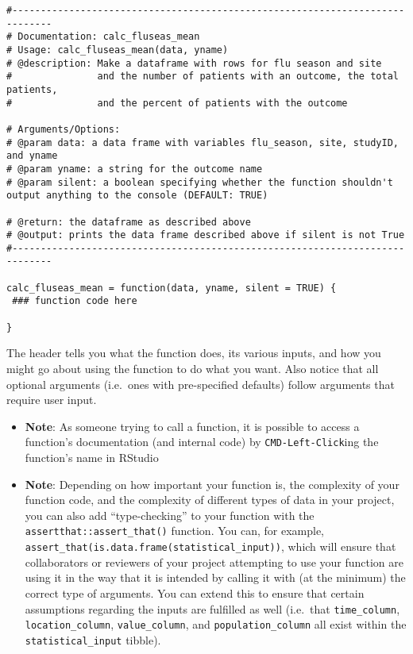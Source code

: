 \documentclass[]{book}
\begin{document}
\begin{verbatim}
#-----------------------------------------------------------------------------
# Documentation: calc_fluseas_mean
# Usage: calc_fluseas_mean(data, yname)
# @description: Make a dataframe with rows for flu season and site
#               and the number of patients with an outcome, the total patients,
#               and the percent of patients with the outcome

# Arguments/Options:
# @param data: a data frame with variables flu_season, site, studyID, and yname
# @param yname: a string for the outcome name
# @param silent: a boolean specifying whether the function shouldn't output anything to the console (DEFAULT: TRUE)

# @return: the dataframe as described above
# @output: prints the data frame described above if silent is not True
#-----------------------------------------------------------------------------

calc_fluseas_mean = function(data, yname, silent = TRUE) {
 ### function code here 

}
\end{verbatim}

The header tells you what the function does, its various inputs, and how you might go about using the function to do what you want. Also notice that all optional arguments (i.e.~ones with pre-specified defaults) follow arguments that require user input.

\begin{itemize}
\item
  \textbf{Note}: As someone trying to call a function, it is possible to access a function's documentation (and internal code) by \texttt{CMD-Left-Click}ing the function's name in RStudio
\item
  \textbf{Note}: Depending on how important your function is, the complexity of your function code, and the complexity of different types of data in your project, you can also add ``type-checking'' to your function with the \texttt{assertthat::assert\_that()} function. You can, for example, \texttt{assert\_that(is.data.frame(statistical\_input))}, which will ensure that collaborators or reviewers of your project attempting to use your function are using it in the way that it is intended by calling it with (at the minimum) the correct type of arguments. You can extend this to ensure that certain assumptions regarding the inputs are fulfilled as well (i.e.~that \texttt{time\_column}, \texttt{location\_column}, \texttt{value\_column}, and \texttt{population\_column} all exist within the \texttt{statistical\_input} tibble).
\end{itemize}
\end{document}
